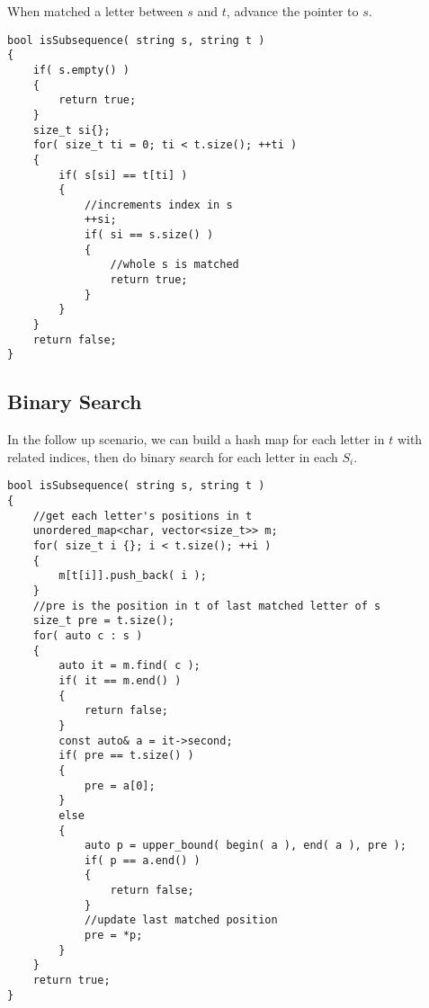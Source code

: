 When matched a letter between $s$ and $t$, advance the pointer to $s$.

\setcounter{lstlisting}{0}
\begin{lstlisting}[style=customc, caption={Two Pointers}]
bool isSubsequence( string s, string t )
{
    if( s.empty() )
    {
        return true;
    }
    size_t si{};
    for( size_t ti = 0; ti < t.size(); ++ti )
    {
        if( s[si] == t[ti] )
        {
            //increments index in s
            ++si;
            if( si == s.size() )
            {
                //whole s is matched
                return true;
            }
        }
    }
    return false;
}
\end{lstlisting}

\subsection{Binary Search}
In the follow up scenario, we can build a hash map for each letter in $t$ with related indices, then do binary search for each letter in each $S_i$.

\begin{lstlisting}[style=customc, caption={Binary Search}]
bool isSubsequence( string s, string t )
{
    //get each letter's positions in t
    unordered_map<char, vector<size_t>> m;
    for( size_t i {}; i < t.size(); ++i )
    {
        m[t[i]].push_back( i );
    }
    //pre is the position in t of last matched letter of s
    size_t pre = t.size();
    for( auto c : s )
    {
        auto it = m.find( c );
        if( it == m.end() )
        {
            return false;
        }
        const auto& a = it->second;
        if( pre == t.size() )
        {
            pre = a[0];
        }
        else
        {
            auto p = upper_bound( begin( a ), end( a ), pre );
            if( p == a.end() )
            {
                return false;
            }
            //update last matched position
            pre = *p;
        }
    }
    return true;
}
\end{lstlisting}